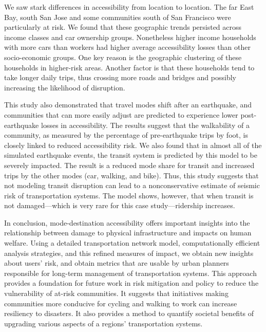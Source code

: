 
We saw stark differences in accessibility from location to location. The far East Bay, south San Jose and some communities south of San Francisco were particularly at risk. We found that these geographic trends persisted across income classes and car ownership groups. Nonetheless higher income households with more cars than workers had higher average accessibility losses than other socio-economic groups. One key reason is the geographic clustering of these households in higher-risk areas. Another factor is that these households tend to take longer daily trips, thus crossing more roads and bridges and possibly increasing the likelihood of disruption.

This study also demonstrated that travel modes shift after an earthquake, and communities that can more easily adjust are predicted to experience lower post-earthquake losses in accessibility. The results suggest that the walkability of a community, as measured by the percentage of pre-earthquake trips by foot, is closely linked to reduced accessibility risk. 
We also found that in almost all of the simulated earthquake events, the transit system is predicted by this model to be severely impacted. The result is a reduced mode share for transit and increased trips by the other modes (car, walking, and bike). Thus, this study suggests that not modeling transit disruption can lead to a nonconservative estimate of seismic risk of transportation systems. The model shows, however, that when transit is not damaged---which is very rare for this case study---ridership increases.

In conclusion,  mode-destination accessibility offers important insights into the relationship between damage to physical infrastructure and impacts on human welfare. 
Using a detailed transportation network model, computationally efficient analysis strategies, and this refined measures of impact, we obtain new insights about users' risk, and obtain metrics that are usable by urban planners responsible for long-term management of  transportation systems.
This approach provides a foundation for future work in risk mitigation and policy to reduce the vulnerability of at-risk communities. It  suggests that initiatives making communities more conducive for cycling and walking to work can increase resiliency to disasters. It also provides a method to quantify societal benefits of upgrading various aspects of a regions' transportation systems.


